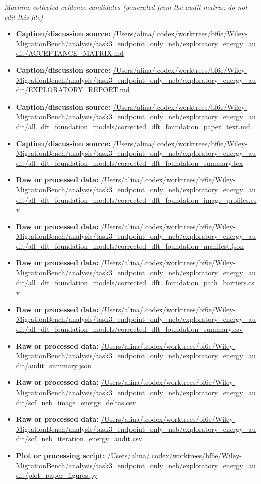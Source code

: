 \emph{Machine-collected evidence candidates (generated from the audit matrix; do not edit this file).}
\begin{itemize}[leftmargin=1.4em,noitemsep]
\item \textbf{Caption/discussion source:} \url{/Users/alina/.codex/worktrees/bf6e/Wiley-MigrationBench/analysis/task3_endpoint_only_neb/exploratory_energy_audit/ACCEPTANCE_MATRIX.md}
\item \textbf{Caption/discussion source:} \url{/Users/alina/.codex/worktrees/bf6e/Wiley-MigrationBench/analysis/task3_endpoint_only_neb/exploratory_energy_audit/EXPLORATORY_REPORT.md}
\item \textbf{Caption/discussion source:} \url{/Users/alina/.codex/worktrees/bf6e/Wiley-MigrationBench/analysis/task3_endpoint_only_neb/exploratory_energy_audit/all_dft_foundation_models/corrected_dft_foundation_paper_text.md}
\item \textbf{Caption/discussion source:} \url{/Users/alina/.codex/worktrees/bf6e/Wiley-MigrationBench/analysis/task3_endpoint_only_neb/exploratory_energy_audit/all_dft_foundation_models/corrected_dft_foundation_summary.tex}
\item \textbf{Raw or processed data:} \url{/Users/alina/.codex/worktrees/bf6e/Wiley-MigrationBench/analysis/task3_endpoint_only_neb/exploratory_energy_audit/all_dft_foundation_models/corrected_dft_foundation_image_profiles.csv}
\item \textbf{Raw or processed data:} \url{/Users/alina/.codex/worktrees/bf6e/Wiley-MigrationBench/analysis/task3_endpoint_only_neb/exploratory_energy_audit/all_dft_foundation_models/corrected_dft_foundation_manifest.json}
\item \textbf{Raw or processed data:} \url{/Users/alina/.codex/worktrees/bf6e/Wiley-MigrationBench/analysis/task3_endpoint_only_neb/exploratory_energy_audit/all_dft_foundation_models/corrected_dft_foundation_path_barriers.csv}
\item \textbf{Raw or processed data:} \url{/Users/alina/.codex/worktrees/bf6e/Wiley-MigrationBench/analysis/task3_endpoint_only_neb/exploratory_energy_audit/all_dft_foundation_models/corrected_dft_foundation_summary.csv}
\item \textbf{Raw or processed data:} \url{/Users/alina/.codex/worktrees/bf6e/Wiley-MigrationBench/analysis/task3_endpoint_only_neb/exploratory_energy_audit/audit_summary.json}
\item \textbf{Raw or processed data:} \url{/Users/alina/.codex/worktrees/bf6e/Wiley-MigrationBench/analysis/task3_endpoint_only_neb/exploratory_energy_audit/scf_neb_image_energy_deltas.csv}
\item \textbf{Raw or processed data:} \url{/Users/alina/.codex/worktrees/bf6e/Wiley-MigrationBench/analysis/task3_endpoint_only_neb/exploratory_energy_audit/scf_neb_iteration_energy_audit.csv}
\item \textbf{Plot or processing script:} \url{/Users/alina/.codex/worktrees/bf6e/Wiley-MigrationBench/analysis/task3_endpoint_only_neb/exploratory_energy_audit/plot_paper_figures.py}
\end{itemize}
